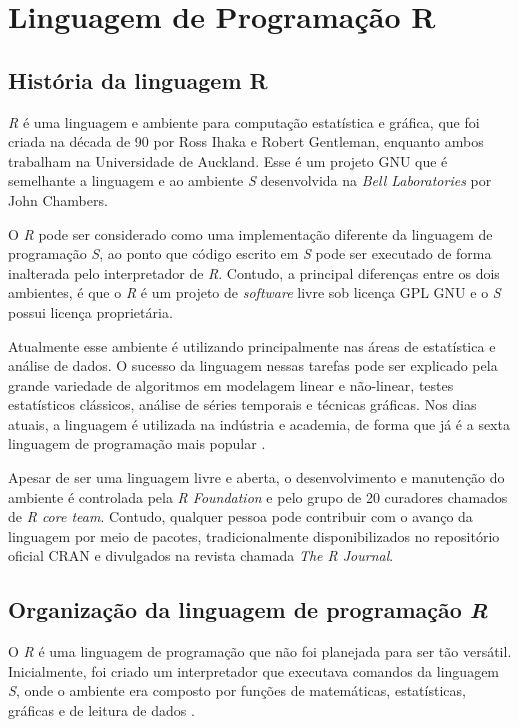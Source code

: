 
\chapter{Linguagem de Programação R}
\label{chap:RProgrammingLanguage}

\section{História da linguagem R}
\textit{R} é uma linguagem e ambiente para computação estatística e gráfica, que foi criada na década de 90 por Ross Ihaka e Robert Gentleman, enquanto ambos trabalham na Universidade de Auckland\cite{Wickham2015}. Esse é um projeto GNU que é semelhante a linguagem e ao ambiente \textit{S} desenvolvida na \textit{Bell Laboratories} por John Chambers. 

O \textit{R} pode ser considerado como uma implementação diferente da linguagem de programação \textit{S}, ao ponto que código escrito em \textit{S} pode ser executado de forma inalterada pelo interpretador de \textit{R}. Contudo, a principal diferenças entre os dois ambientes, é que o \textit{R} é um projeto de \textit{software} livre sob licença GPL GNU e o \textit{S} possui licença proprietária\cite{Wickham2015}.

Atualmente esse ambiente é utilizando principalmente nas áreas de estatística e análise de dados. O sucesso da linguagem nessas tarefas pode ser explicado pela grande variedade de  algoritmos em modelagem linear e não-linear, testes estatísticos clássicos, análise de séries temporais e técnicas gráficas. Nos dias atuais, a linguagem é utilizada na indústria e academia, de forma que já é a sexta linguagem de programação mais popular \cite{Cass2017}.

Apesar de ser uma linguagem livre e aberta, o desenvolvimento e manutenção do ambiente é controlada pela \textit{R Foundation} e pelo grupo de 20 curadores chamados de \textit{R core team}. Contudo, qualquer pessoa pode contribuir com o avanço da linguagem por meio de pacotes, tradicionalmente disponibilizados no repositório oficial CRAN e divulgados na revista chamada \textit{The R Journal}.


\section{Organização da linguagem de programação \textit{R}}
O \textit{R} é uma linguagem de programação que não foi planejada para ser tão versátil. Inicialmente, foi criado um interpretador que executava comandos da linguagem \textit{S}, onde o ambiente era composto por funções de matemáticas, estatísticas, gráficas e de leitura de dados \cite{R-project}.

